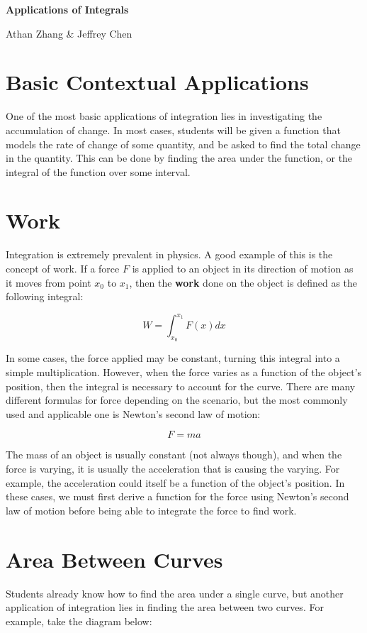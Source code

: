 \documentclass[11pt]{article}
\begin{document}
\textbf{\Huge Applications of Integrals}

Athan Zhang \& Jeffrey Chen

\section{Basic Contextual Applications}
One of the most basic applications of integration lies in investigating the accumulation of change. In most cases, students will be given a function that models the rate of change of some quantity, and be asked to find the total change in the quantity. This can be done by finding the area under the function, or the integral of the function over some interval.


\section{Work}
Integration is extremely prevalent in physics. A good example of this is the concept of work. If a force $F$ is applied to an object in its direction of motion as it moves from point $x_0$ to $x_1$, then the \textbf{work} done on the object is defined as the following integral:

\[ W = \int_{x_0}^{x_1} F(x) dx \]

In some cases, the force applied may be constant, turning this integral into a simple multiplication. However, when the force varies as a function of the object's position, then the integral is necessary to account for the curve. There are many different formulas for force depending on the scenario, but the most commonly used and applicable one is Newton's second law of motion:

\[ F = ma \]

The mass of an object is usually constant (not always though), and when the force is varying, it is usually the acceleration that is causing the varying. For example, the acceleration could itself be a function of the object's position. In these cases, we must first derive a function for the force using Newton's second law of motion before being able to integrate the force to find work.

\section{Area Between Curves}
Students already know how to find the area under a single curve, but another application of integration lies in finding the area between two curves. For example, take the diagram below:
\end{document}
